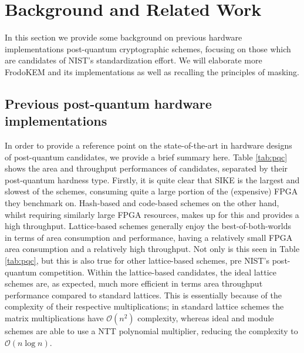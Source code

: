 \section{Background and Related Work} \label{sec:related}
  
In this section we provide some background on previous hardware implementations post-quantum cryptographic schemes, focusing on those which are candidates of NIST's standardization effort. We will elaborate more FrodoKEM and its implementations as well as recalling the principles of masking.

\subsection{Previous post-quantum hardware implementations}

In order to provide a reference point on the state-of-the-art in hardware designs of post-quantum candidates, we provide a brief summary here. Table \ref{tab:pqc} shows the area and throughput performances of candidates, separated by their post-quantum hardness type. Firstly, it is quite clear that SIKE is the largest and slowest of the schemes, consuming quite a large portion of the (expensive) FPGA they benchmark on. Hash-based and code-based schemes on the other hand, whilst requiring similarly large FPGA resources, makes up for this and provides a high throughput. Lattice-based schemes generally enjoy the best-of-both-worlds in terms of area consumption and performance, having a relatively small FPGA area consumption and a relatively high throughput. Not only is this seen in Table \ref{tab:pqc}, but this is also true for other lattice-based schemes, pre NIST's post-quantum competition. Within the lattice-based candidates, the ideal lattice schemes are, as expected, much more efficient in terms area throughput performance compared to standard lattices. This is essentially because of the complexity of their respective multiplications; in standard lattice schemes the matrix multiplications have $ \mathcal{O}(n^2)$ complexity, whereas ideal and module schemes are able to use a NTT polynomial multiplier, reducing the complexity to $ \mathcal{O}(n\log n)$.

